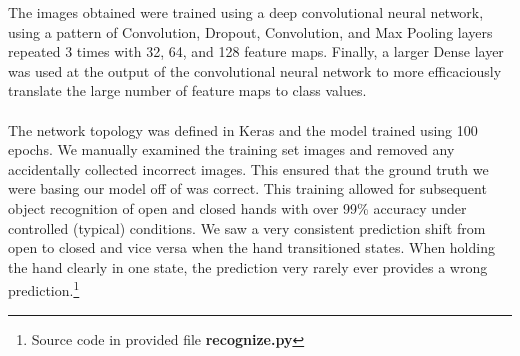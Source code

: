 \documentclass[twoside,twocolumn]{article}
\begin{document}
The images obtained were trained using a deep convolutional neural network, using a pattern of Convolution, Dropout, Convolution, and Max Pooling layers repeated 3 times with 32, 64, and 128 feature maps. Finally, a larger Dense layer was used at the output of the convolutional neural network to more efficaciously translate the large number of feature maps to class values. \\ \\
The network topology was defined in Keras and the model trained using 100 epochs. We manually examined the training set images and removed any accidentally collected incorrect images. This ensured that the ground truth we were basing our model off of was correct. This training allowed for subsequent object recognition of open and closed hands with over 99\% accuracy under controlled (typical) conditions. We saw a very consistent prediction shift from open to closed and vice versa when the hand transitioned states. When holding the hand clearly in one state, the prediction very rarely ever provides a wrong prediction.\footnote{Source code in provided file \textbf{recognize.py}}
\end{document}
